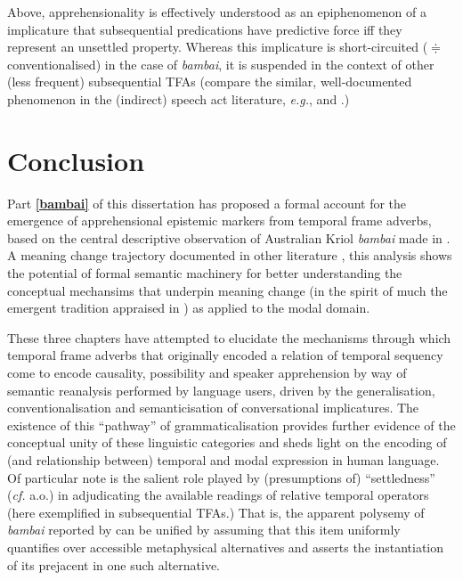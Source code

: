 Above, apprehensionality is effectively understood as an epiphenomenon of a implicature that subsequential predications have predictive force iff they represent an unsettled property. Whereas this implicature is short-circuited ($ \doteqdot $ conventionalised) in the case of \textit{bambai}, it is suspended in the context of other (less frequent) subsequential TFAs (compare the similar, well-documented phenomenon in the (indirect) speech act literature, \textit{e.g.}, \citealt[29-31]{Horn1984} and \citealt{Morgan1978}.)


\section{Conclusion}\label{bambai.concl}

Part \textbf{\ref{bambai}} of this dissertation has proposed a formal account for the emergence of apprehensional epistemic markers from temporal frame adverbs, based on the central descriptive observation of Australian Kriol \textit{bambai} made in \cite{Angelo2016}. A meaning change trajectory documented in other literature \citep{Kuteva2019a,Kuteva2019,Angelo2018}, this analysis shows the potential of formal semantic machinery for better understanding the conceptual mechansims that underpin  meaning change (in the spirit of much the emergent tradition appraised in \citealt{Deo2015}) as applied to the modal domain. %


These three chapters have attempted to elucidate the mechanisms through which temporal frame adverbs that originally encoded a relation of temporal sequency come to encode causality, possibility and speaker apprehension by way of semantic reanalysis performed by language users, driven by the generalisation, conventionalisation and semanticisation of conversational implicatures. The existence of this ``pathway'' of grammaticalisation provides further evidence of the conceptual unity of these linguistic categories and sheds light on the encoding of (and relationship between) temporal and modal expression in human language. Of particular note is the salient role played by (presumptions of) ``settledness'' (\textit{cf.} \citealp{Condoravdi2002,Kaufmann2005} a.o.) in adjudicating the available readings of relative temporal operators (here exemplified in subsequential TFAs.) That is, the apparent polysemy of \textit{bambai} reported by \citet{Angelo2016} can be unified by assuming that this item uniformly quantifies over accessible metaphysical  alternatives and asserts the instantiation of its prejacent in one such alternative.

